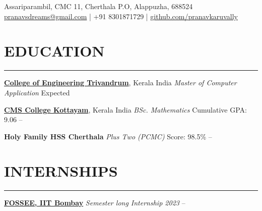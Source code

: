 \documentclass[letterpaper,MMMyyyy,nonstopmode]{simpleresumecv}
\begin{document}
    \begin{center}
        
        \begin{SubTitle}
        Assariparambil, CMC 11, Cherthala P.O, Alappuzha, 688524 \\
        \href{mailto:pranavsdreams@gmail.com} {pranavsdreams@gmail.com}
        | +91 8301871729
        | \href{https://github.com/pranavkaruvally} {\url{github.com/pranavkaruvally}}
        \end{SubTitle}
    \end{center}

    \section*{EDUCATION}
        \hrule
        \vspace{2pt}
        {\href{https://cet.ac.in}{\textbf{\large College of Engineering Trivandrum}},
        {\large Kerala India}  
        \newline\textit{\large Master of Computer Application}}
        \hfill
        Expected 
        \vspace{5pt}

        {\href{https://cmscollege.ac.in}{\textbf{\large CMS College Kottayam}},
        {\large Kerala India}
        \newline\textit{\large BSc. Mathematics}
        \newline Cumulative GPA: 9.06}
        \hfill
         --
        \vspace{5pt}

        {\textbf{\large Holy Family HSS Cherthala}
        \newline\textit{\large Plus Two (PCMC)}
        \newline Score: 98.5\%}
        \hfill
         --

    \section*{INTERNSHIPS}
        \hrule \vspace{2pt}
        {\href{https://fossee.in}{\textbf{\large FOSSEE, IIT Bombay}}
        \newline\textit{\large Semester long Internship 2023}
        }
        \hfill
        { --
        }
        
\end{document}
